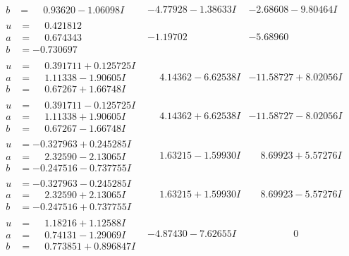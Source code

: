 \documentclass[1p]{elsarticle_modified}
\theoremstyle{definition}
\begin{document}
$$\begin{array}{c|c|c}
\begin{aligned}
b &= \phantom{-}0.93620 - 1.06098 I\end{aligned}
 & -4.77928 - 1.38633 I & -2.68608 - 9.80464 I \\ \hline\begin{aligned}
u &= \phantom{-}0.421812\phantom{ +0.000000I} \\
a &= \phantom{-}0.674343\phantom{ +0.000000I} \\
b &= -0.730697\phantom{ +0.000000I}\end{aligned}
 & -1.19702\phantom{ +0.000000I} & -5.68960\phantom{ +0.000000I} \\ \hline\begin{aligned}
u &= \phantom{-}0.391711 + 0.125725 I \\
a &= \phantom{-}1.11338 - 1.90605 I \\
b &= \phantom{-}0.67267 + 1.66748 I\end{aligned}
 & \phantom{-}4.14362 - 6.62538 I & -11.58727 + 8.02056 I \\ \hline\begin{aligned}
u &= \phantom{-}0.391711 - 0.125725 I \\
a &= \phantom{-}1.11338 + 1.90605 I \\
b &= \phantom{-}0.67267 - 1.66748 I\end{aligned}
 & \phantom{-}4.14362 + 6.62538 I & -11.58727 - 8.02056 I \\ \hline\begin{aligned}
u &= -0.327963 + 0.245285 I \\
a &= \phantom{-}2.32590 - 2.13065 I \\
b &= -0.247516 - 0.737755 I\end{aligned}
 & \phantom{-}1.63215 - 1.59930 I & \phantom{-}8.69923 + 5.57276 I \\ \hline\begin{aligned}
u &= -0.327963 - 0.245285 I \\
a &= \phantom{-}2.32590 + 2.13065 I \\
b &= -0.247516 + 0.737755 I\end{aligned}
 & \phantom{-}1.63215 + 1.59930 I & \phantom{-}8.69923 - 5.57276 I \\ \hline\begin{aligned}
u &= \phantom{-}1.18216 + 1.12588 I \\
a &= \phantom{-}0.74131 - 1.29069 I \\
b &= \phantom{-}0.773851 + 0.896847 I\end{aligned}
 & -4.87430 - 7.62655 I & \phantom{-0.000000 } 0\\

\end{array}$$
\end{document}
